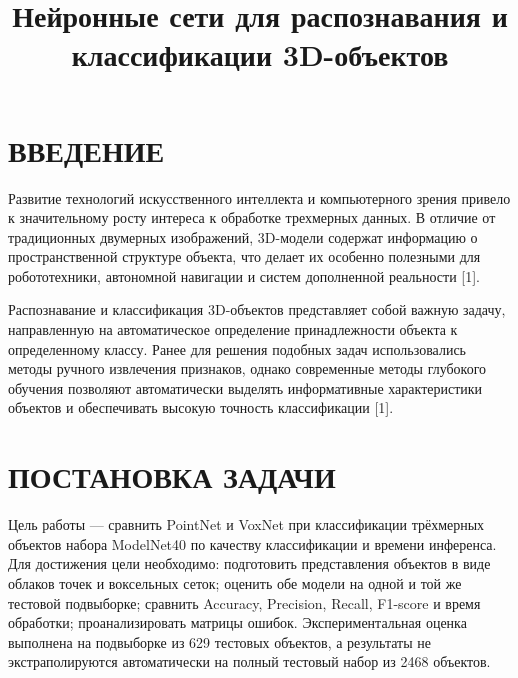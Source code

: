 \documentclass{misisarticle}
\title{Нейронные сети для распознавания и классификации 3D-объектов}
\begin{document}
\maketitle
\section{ВВЕДЕНИЕ}
Развитие технологий искусственного интеллекта и компьютерного зрения привело к значительному росту интереса к обработке трехмерных данных. В отличие от традиционных двумерных изображений, 3D-модели содержат информацию о пространственной структуре объекта, что делает их особенно полезными для робототехники, автономной навигации и систем дополненной реальности [1].\par
Распознавание и классификация 3D-объектов представляет собой важную задачу, направленную на автоматическое определение принадлежности объекта к определенному классу. Ранее для решения подобных задач использовались методы ручного извлечения признаков, однако современные методы глубокого обучения позволяют автоматически выделять информативные характеристики объектов и обеспечивать высокую точность классификации [1].\par
\section{ПОСТАНОВКА ЗАДАЧИ}
Цель работы — сравнить PointNet и VoxNet при классификации трёхмерных объектов набора ModelNet40 по качеству классификации и времени инференса. Для достижения цели необходимо: подготовить представления объектов в виде облаков точек и воксельных сеток; оценить обе модели на одной и той же тестовой подвыборке; сравнить Accuracy, Precision, Recall, F1-score и время обработки; проанализировать матрицы ошибок. Экспериментальная оценка выполнена на подвыборке из 629 тестовых объектов, а результаты не экстраполируются автоматически на полный тестовый набор из 2468 объектов.\par
\end{document}

